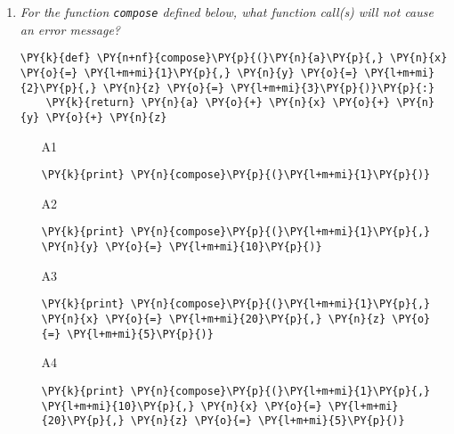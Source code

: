 \begin{enumerate}
\vspace{6mm}

\item {\em For the function {\tt compose} defined below, what function call(s) will not cause an error message?}\\

\begin{Verbatim}[commandchars=\\\{\}]
\PY{k}{def} \PY{n+nf}{compose}\PY{p}{(}\PY{n}{a}\PY{p}{,} \PY{n}{x} \PY{o}{=} \PY{l+m+mi}{1}\PY{p}{,} \PY{n}{y} \PY{o}{=} \PY{l+m+mi}{2}\PY{p}{,} \PY{n}{z} \PY{o}{=} \PY{l+m+mi}{3}\PY{p}{)}\PY{p}{:}
    \PY{k}{return} \PY{n}{a} \PY{o}{+} \PY{n}{x} \PY{o}{+} \PY{n}{y} \PY{o}{+} \PY{n}{z}
\end{Verbatim}
\vspace{6mm}

\begin{enumerate}
\item[A1] 
\begin{Verbatim}[commandchars=\\\{\}]
\PY{k}{print} \PY{n}{compose}\PY{p}{(}\PY{l+m+mi}{1}\PY{p}{)}
\end{Verbatim}
\item[A2] 
\begin{Verbatim}[commandchars=\\\{\}]
\PY{k}{print} \PY{n}{compose}\PY{p}{(}\PY{l+m+mi}{1}\PY{p}{,} \PY{n}{y} \PY{o}{=} \PY{l+m+mi}{10}\PY{p}{)}
\end{Verbatim}
\item[A3] 
\begin{Verbatim}[commandchars=\\\{\}]
\PY{k}{print} \PY{n}{compose}\PY{p}{(}\PY{l+m+mi}{1}\PY{p}{,} \PY{n}{x} \PY{o}{=} \PY{l+m+mi}{20}\PY{p}{,} \PY{n}{z} \PY{o}{=} \PY{l+m+mi}{5}\PY{p}{)}
\end{Verbatim}
\item[A4] 
\begin{Verbatim}[commandchars=\\\{\}]
\PY{k}{print} \PY{n}{compose}\PY{p}{(}\PY{l+m+mi}{1}\PY{p}{,} \PY{l+m+mi}{10}\PY{p}{,} \PY{n}{x} \PY{o}{=} \PY{l+m+mi}{20}\PY{p}{,} \PY{n}{z} \PY{o}{=} \PY{l+m+mi}{5}\PY{p}{)}
\end{Verbatim}
\end{enumerate}

\vspace{6mm}

\end{enumerate}


